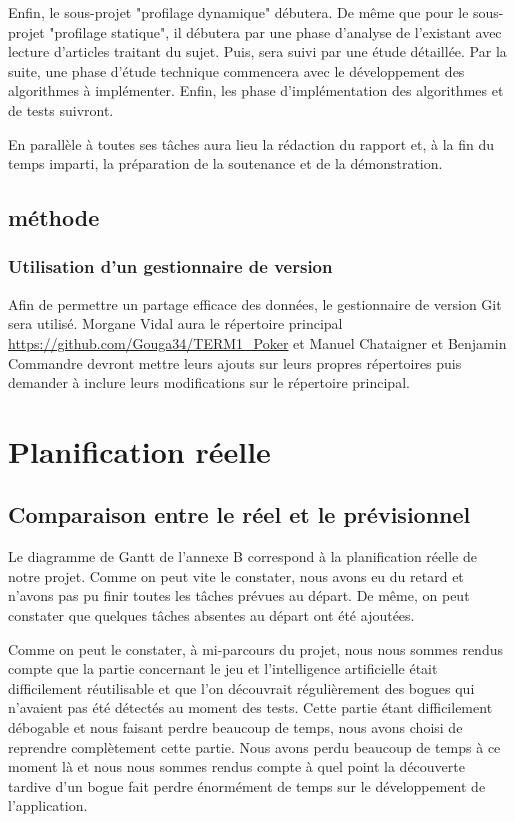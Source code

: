\documentclass{report}
\begin{document}
Enfin, le sous-projet "profilage dynamique" débutera. De même que pour le sous-projet "profilage statique", il débutera par une phase d'analyse de l'existant avec lecture d'articles traitant du sujet. Puis, sera suivi par une étude détaillée. Par la suite, une phase d'étude technique commencera avec le développement des algorithmes à implémenter. Enfin, les phase d'implémentation des algorithmes et de tests suivront.\par
En parallèle à toutes ses tâches aura lieu la rédaction du rapport et, à la fin du temps imparti, la préparation de la soutenance et de la démonstration. \par

\section{méthode}
\subsection{Utilisation d'un gestionnaire de version}
\hspace{0.5cm}Afin de permettre un partage efficace des données, le gestionnaire de version Git sera utilisé. Morgane Vidal aura le répertoire principal \url{https://github.com/Gouga34/TERM1_Poker} et Manuel Chataigner et Benjamin Commandre devront mettre leurs ajouts sur leurs propres répertoires puis demander à inclure leurs modifications sur le répertoire principal. \par

\chapter{Planification réelle}
\section{Comparaison entre le réel et le prévisionnel}
\hspace{0.5cm}Le diagramme de Gantt de l'annexe B correspond à la planification réelle de notre projet. Comme on peut vite le constater, nous avons eu du retard et n'avons pas pu finir toutes les tâches prévues au départ. De même, on peut constater que quelques tâches absentes au départ ont été ajoutées.\par



Comme on peut le constater, à mi-parcours du projet, nous nous sommes rendus compte que la partie concernant le jeu et l'intelligence artificielle était difficilement réutilisable et que l'on découvrait régulièrement des bogues qui n'avaient pas été détectés au moment des tests. Cette partie étant difficilement débogable et nous faisant perdre beaucoup de temps, nous avons choisi de reprendre complètement cette partie. Nous avons perdu beaucoup de temps à ce moment là et nous nous sommes rendus compte à quel point la découverte tardive d'un bogue fait perdre énormément de temps sur le développement de l'application.\par
\end{document}

